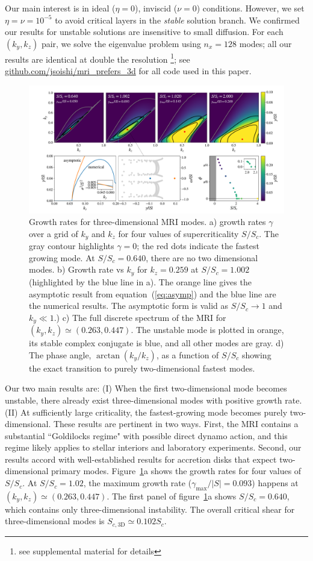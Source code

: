 \documentclass[aps,prl,reprint,superscriptaddress]{revtex4-1}
\newcommand{\SSC}{S/S_{c}}
\begin{document}
Our main interest is in ideal ($\eta=0$), inviscid ($\nu=0$) conditions.
However, we set $\eta=\nu=10^{-5}$ to avoid critical layers in the \textit{stable} solution branch.
We confirmed our results for unstable solutions are insensitive to small diffusion. 
For each $(k_{y},k_{z})$ pair, we solve the eigenvalue problem using $n_{x}=128$ modes; all our results are identical at double the resolution \footnote{see supplemental material for details}; see \protect\url{github.com/jsoishi/mri_prefers_3d} for all code used in this paper.
\begin{figure}[ht]
  \includegraphics[width=\textwidth]{fig_1.pdf}
  \caption{Growth rates for three-dimensional MRI modes. 
  a) growth rates $\gamma$ over a grid of $k_{y}$ and $k_{z}$ for four values of supercriticality $\SSC$. 
  The gray contour highlights $\gamma=0$; the red dots indicate the fastest growing mode. 
  At $\SSC=0.640$, there are no two dimensional modes. 
  b) Growth rate vs $k_{y}$ for $k_{z}=0.259$ at $\SSC=1.002$ (highlighted by the blue line in a). 
  The orange line gives the asymptotic result from equation~(\ref{eq:asymp}) and the blue line are the numerical results. 
  The asymptotic form is valid as $\SSC\to1$ and $k_{y}\ll1$.) c) The full discrete spectrum of the MRI for $(k_{y},k_{z})\simeq(0.263,0.447)$. 
  The unstable mode is plotted in orange, its stable complex conjugate is blue, and all other modes are gray. 
  d) The phase angle, $\arctan(k_{y}/k_{z})$, as a function of $\SSC$ showing the exact transition to purely two-dimensional fastest modes.}
  \label{fig:growth_rate}
\end{figure}

Our two main results are: 
(I) When the first two-dimensional mode becomes unstable, there already exist three-dimensional modes with positive growth rate. 
(II) At sufficiently large criticality, the fastest-growing mode becomes purely two-dimensional. 
These results are pertinent in two ways. 
First, the MRI contains a substantial ``Goldilocks regime" with possible direct dynamo action, and this regime likely applies to stellar interiors and laboratory experiments. 
Second, our results accord with well-established results for accretion disks that expect two-dimensional primary modes.
Figure~\ref{fig:growth_rate}a shows the growth rates for four values of $\SSC$. 
At $\SSC=1.02$, the maximum growth rate ($\gamma_{\max}/|S|=0.093$) happens at $(k_{y},k_{z})\simeq(0.263,0.447)$.
The first panel of figure~\ref{fig:growth_rate}a shows $\SSC=0.640$, which contains only three-dimensional instability.
The overall critical shear for three-dimensional modes is $S_{c,\text{3D}}\simeq0.102S_c$.
\end{document}
